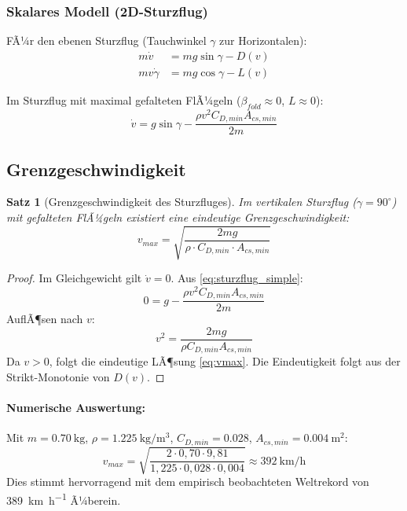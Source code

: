 ﻿\documentclass[12pt,a4paper]{article}
\newtheorem{theorem}{Satz}[section]
\theoremstyle{remark}
\begin{document}
	\subsubsection{Skalares Modell (2D-Sturzflug)}
	
	FÃ¼r den ebenen Sturzflug (Tauchwinkel $\gamma$ zur Horizontalen):
	\begin{align}
		m\dot{v} &= mg\sin\gamma - D(v) \label{eq:2d_v} \\
		mv\dot{\gamma} &= mg\cos\gamma - L(v) \label{eq:2d_gamma}
	\end{align}
	
	Im Sturzflug mit maximal gefalteten FlÃ¼geln ($\beta_{fold} \approx 0$, $L \approx 0$):
	\begin{equation}
		\dot{v} = g\sin\gamma - \frac{\rho v^2 C_{D,min} A_{cs,min}}{2m}
		\label{eq:sturzflug_simple}
	\end{equation}
	
	\subsection{Grenzgeschwindigkeit}
	
	\begin{theorem}[Grenzgeschwindigkeit des Sturzfluges]
		\label{thm:grenz}
		Im vertikalen Sturzflug ($\gamma = 90^\circ$) mit gefalteten FlÃ¼geln existiert eine eindeutige Grenzgeschwindigkeit:
		\begin{equation}
			v_{max} = \sqrt{\frac{2mg}{\rho \cdot C_{D,min} \cdot A_{cs,min}}}
			\label{eq:vmax}
		\end{equation}
	\end{theorem}
	
	\begin{proof}
		Im Gleichgewicht gilt $\dot{v} = 0$. Aus \cref{eq:sturzflug_simple}:
		\[
		0 = g - \frac{\rho v^2 C_{D,min} A_{cs,min}}{2m}
		\]
		AuflÃ¶sen nach $v$:
		\[
		v^2 = \frac{2mg}{\rho C_{D,min} A_{cs,min}}
		\]
		Da $v > 0$, folgt die eindeutige LÃ¶sung \cref{eq:vmax}. Die Eindeutigkeit folgt aus der Strikt-Monotonie von $D(v)$.
	\end{proof}
	
	\paragraph{Numerische Auswertung:} Mit $m = \SI{0.70}{\kg}$, $\rho = \SI{1.225}{\kg\per\m^3}$, $C_{D,min} = 0.028$, $A_{cs,min} = \SI{0.004}{\m^2}$:
	\begin{equation}
		v_{max} = \sqrt{\frac{2 \cdot 0{,}70 \cdot 9{,}81}{1{,}225 \cdot 0{,}028 \cdot 0{,}004}} \approx \SI{392}{\km\per\hour}
	\end{equation}
	Dies stimmt hervorragend mit dem empirisch beobachteten Weltrekord von \SI{389}{\km\per\hour} Ã¼berein.
	
\end{document}

